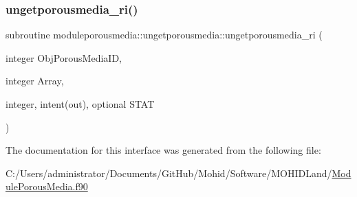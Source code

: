 \subsubsection{\texorpdfstring{ungetporousmedia\+\_\+ri()}{ungetporousmedia\_ri()}}
{\footnotesize\ttfamily subroutine moduleporousmedia\+::ungetporousmedia\+::ungetporousmedia\+\_\+ri (\begin{DoxyParamCaption}\item[{integer}]{Obj\+Porous\+Media\+ID,  }\item[{integer}]{Array,  }\item[{integer, intent(out), optional}]{S\+T\+AT }\end{DoxyParamCaption})\hspace{0.3cm}{\ttfamily [private]}}



The documentation for this interface was generated from the following file\+:\begin{DoxyCompactItemize}
\item 
C\+:/\+Users/administrator/\+Documents/\+Git\+Hub/\+Mohid/\+Software/\+M\+O\+H\+I\+D\+Land/\mbox{\hyperlink{_module_porous_media_8f90}{Module\+Porous\+Media.\+f90}}\end{DoxyCompactItemize}
